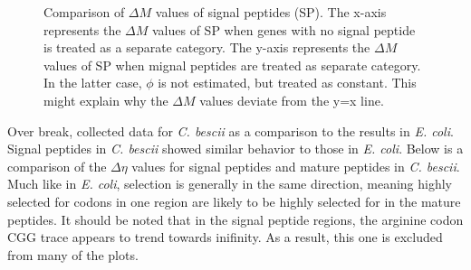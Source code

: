 \documentclass[11pt]{labbook}
\begin{document}
\begin{figure}[H]
\caption{Comparison of $\Delta\mathit{M}$ values of signal peptides (SP). The x-axis represents the $\Delta\mathit{M}$ values of SP when genes with no signal peptide is treated as a separate category. The y-axis represents the $\Delta\mathit{M}$ values of SP when mignal peptides are treated as separate category. In the latter case, $\phi$ is not estimated, but treated as constant. This might explain why the $\Delta\mathit{M}$ values deviate from the y=x line.}
\end{figure}


Over break, collected data for \textit{C. bescii} as a comparison to the results in \textit{E. coli}. Signal peptides in \textit{C. bescii} showed similar behavior to those in \textit{E. coli}. Below is a comparison of the $\Delta\eta$ values for signal peptides and mature peptides in \textit{C. bescii}. Much like in \textit{E. coli}, selection is generally in the same direction, meaning highly selected for codons in one region are likely to be highly selected for in the mature peptides. It should be noted that in the signal peptide regions, the arginine codon CGG trace appears to trend towards inifinity. As a result, this one is excluded from many of the plots. 
\
\end{document}
